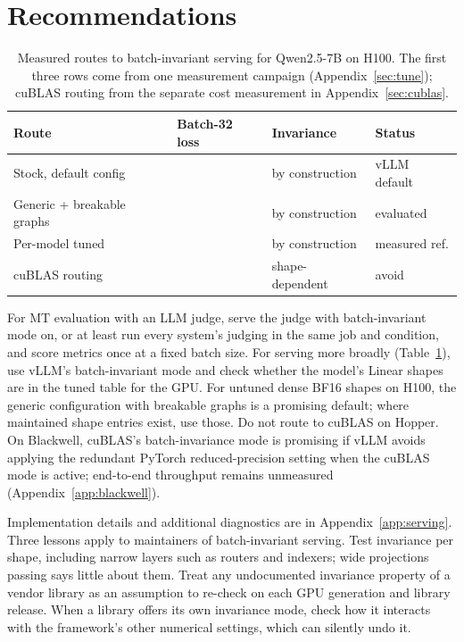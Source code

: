 \section{Recommendations}\label{sec:rec}
\begin{table}[t]\centering\small
\begin{tabular}{llll}
\toprule
Route & Batch-32 loss & Invariance & Status \\
\midrule
Stock, default config & \GenericStockB{} & by construction & vLLM default \\
Generic + breakable graphs & \GenDefaultLossBatchThirtyTwo{} & by construction & evaluated \\
Per-model tuned & \TunedB{} & by construction & measured ref. \\
cuBLAS routing & \QsevenPlain{} & shape-dependent & avoid \\
\bottomrule
\end{tabular}
\caption{Measured routes to batch-invariant serving for Qwen2.5-7B on H100. The first three rows come from one measurement campaign (Appendix~\ref{sec:tune}); cuBLAS routing from the separate cost measurement in Appendix~\ref{sec:cublas}.}\label{tab:rec}
\end{table}
For MT evaluation with an LLM judge, serve the judge with batch-invariant mode on, or at least run every system's judging in the same job and condition, and score metrics once at a fixed batch size. For serving more broadly (Table~\ref{tab:rec}), use vLLM's batch-invariant mode and check whether the model's Linear shapes are in the tuned table for the GPU. For untuned dense BF16 shapes on H100, the generic configuration with breakable graphs is a promising default; where maintained shape entries exist, use those. Do not route to cuBLAS on Hopper. On Blackwell, cuBLAS's batch-invariance mode is promising if vLLM avoids applying the redundant PyTorch reduced-precision setting when the cuBLAS mode is active; end-to-end throughput remains unmeasured (Appendix~\ref{app:blackwell}).

Implementation details and additional diagnostics are in Appendix~\ref{app:serving}. Three lessons apply to maintainers of batch-invariant serving. Test invariance per shape, including narrow layers such as routers and indexers; wide projections passing says little about them. Treat any undocumented invariance property of a vendor library as an assumption to re-check on each GPU generation and library release. When a library offers its own invariance mode, check how it interacts with the framework's other numerical settings, which can silently undo it.

